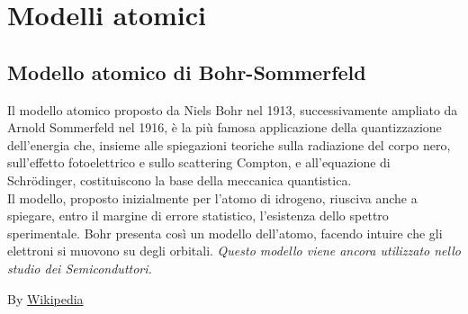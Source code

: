 \documentclass{book}
\begin{document}
\chapter{Modelli atomici}
\section{Modello atomico di Bohr-Sommerfeld}
Il modello atomico proposto da Niels Bohr nel 1913, successivamente ampliato da Arnold Sommerfeld nel 1916, è la più famosa applicazione della quantizzazione dell'energia che, insieme alle spiegazioni teoriche sulla radiazione del corpo nero, sull'effetto fotoelettrico e sullo scattering Compton, e all'equazione di Schrödinger, costituiscono la base della meccanica quantistica.\\
Il modello, proposto inizialmente per l'atomo di idrogeno, riusciva anche a spiegare, entro il margine di errore statistico, l'esistenza dello spettro sperimentale. Bohr presenta così un modello dell'atomo, facendo intuire che gli elettroni si muovono su degli orbitali. \textit{Questo modello viene ancora utilizzato nello studio dei Semiconduttori.} 
\begin{center}
	By \href{https://it.wikipedia.org/wiki/Modello_atomico_di_Bohr}{Wikipedia}
\end{center}
\end{document}
